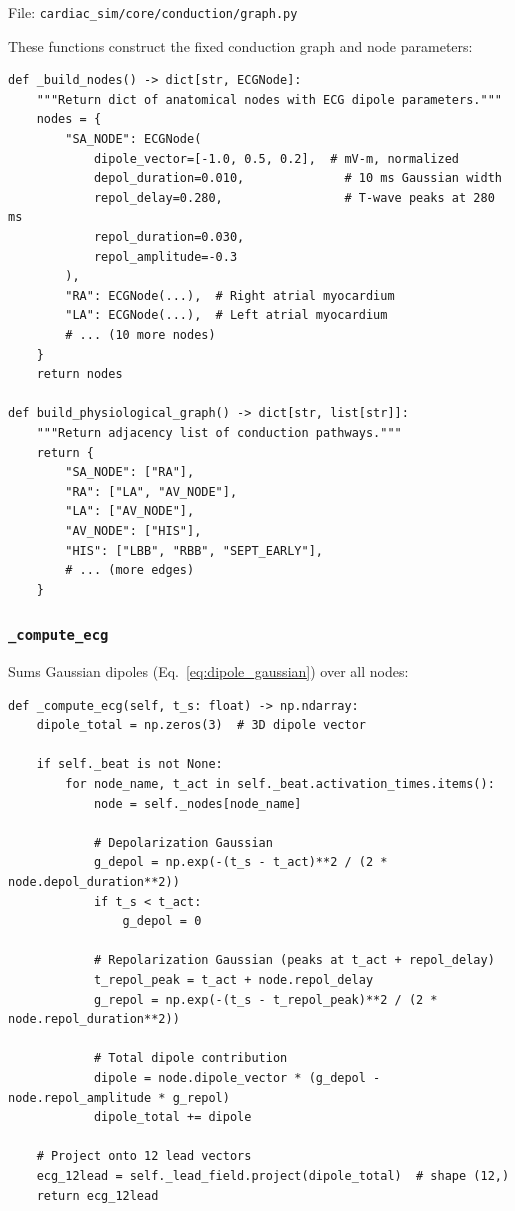 \documentclass[12pt,a4paper,oneside]{book}
\begin{document}
File: \texttt{cardiac\_sim/core/conduction/graph.py}

These functions construct the fixed conduction graph and node parameters:

\begin{lstlisting}
def _build_nodes() -> dict[str, ECGNode]:
    """Return dict of anatomical nodes with ECG dipole parameters."""
    nodes = {
        "SA_NODE": ECGNode(
            dipole_vector=[-1.0, 0.5, 0.2],  # mV-m, normalized
            depol_duration=0.010,              # 10 ms Gaussian width
            repol_delay=0.280,                 # T-wave peaks at 280 ms
            repol_duration=0.030,
            repol_amplitude=-0.3
        ),
        "RA": ECGNode(...),  # Right atrial myocardium
        "LA": ECGNode(...),  # Left atrial myocardium
        # ... (10 more nodes)
    }
    return nodes

def build_physiological_graph() -> dict[str, list[str]]:
    """Return adjacency list of conduction pathways."""
    return {
        "SA_NODE": ["RA"],
        "RA": ["LA", "AV_NODE"],
        "LA": ["AV_NODE"],
        "AV_NODE": ["HIS"],
        "HIS": ["LBB", "RBB", "SEPT_EARLY"],
        # ... (more edges)
    }
\end{lstlisting}

\subsubsection{\texttt{\_compute\_ecg}}

Sums Gaussian dipoles (Eq.~\ref{eq:dipole_gaussian}) over all nodes:

\begin{lstlisting}
def _compute_ecg(self, t_s: float) -> np.ndarray:
    dipole_total = np.zeros(3)  # 3D dipole vector
    
    if self._beat is not None:
        for node_name, t_act in self._beat.activation_times.items():
            node = self._nodes[node_name]
            
            # Depolarization Gaussian
            g_depol = np.exp(-(t_s - t_act)**2 / (2 * node.depol_duration**2))
            if t_s < t_act:
                g_depol = 0
            
            # Repolarization Gaussian (peaks at t_act + repol_delay)
            t_repol_peak = t_act + node.repol_delay
            g_repol = np.exp(-(t_s - t_repol_peak)**2 / (2 * node.repol_duration**2))
            
            # Total dipole contribution
            dipole = node.dipole_vector * (g_depol - node.repol_amplitude * g_repol)
            dipole_total += dipole
    
    # Project onto 12 lead vectors
    ecg_12lead = self._lead_field.project(dipole_total)  # shape (12,)
    return ecg_12lead
\end{lstlisting}
\end{document}
